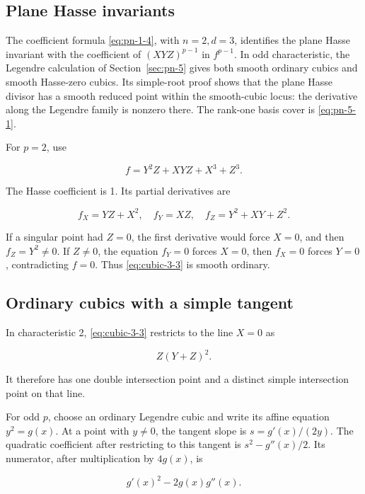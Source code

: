 \documentclass[11pt]{article}
\begin{document}
\subsection{Plane Hasse invariants}\label{sec:plane-cubic-hasse}

The coefficient formula \eqref{eq:pn-1-4}, with \(n=2,d=3\), identifies the plane Hasse invariant with the coefficient of \((XYZ)^{p-1}\) in \(f^{p-1}\). In odd characteristic, the Legendre calculation of Section~\ref{sec:pn-5} gives both smooth ordinary cubics and smooth Hasse-zero cubics. Its simple-root proof shows that the plane Hasse divisor has a smooth reduced point within the smooth-cubic locus: the derivative along the Legendre family is nonzero there. The rank-one basis cover is \eqref{eq:pn-5-1}.

For \(p=2\), use

\begin{equation}
f=Y^2Z+XYZ+X^3+Z^3.
\label{eq:cubic-3-3}
\end{equation}

The Hasse coefficient is 1. Its partial derivatives are

\[
f_X=YZ+X^2,\quad f_Y=XZ,\quad
f_Z=Y^2+XY+Z^2.
\]

If a singular point had \(Z=0\), the first derivative would force \(X=0\), and then \(f_Z=Y^2\ne0\). If \(Z\ne0\), the equation \(f_Y=0\) forces \(X=0\), then \(f_X=0\) forces \(Y=0\), contradicting \(f=0\). Thus \eqref{eq:cubic-3-3} is smooth ordinary.

\subsection{Ordinary cubics with a simple tangent}\label{sec:plane-cubic-tangent}

In characteristic 2, \eqref{eq:cubic-3-3} restricts to the line \(X=0\) as

\[
Z(Y+Z)^2.
\]

It therefore has one double intersection point and a distinct simple intersection point on that line.

For odd \(p\), choose an ordinary Legendre cubic and write its affine equation \(y^2=g(x)\). At a point with \(y\ne0\), the tangent slope is \(s=g'(x)/(2y)\). The quadratic coefficient after restricting to this tangent is \(s^2-g''(x)/2\). Its numerator, after multiplication by \(4g(x)\), is

\begin{equation}
g'(x)^2-2g(x)g''(x).
\label{eq:cubic-3-4}
\end{equation}
\end{document}
